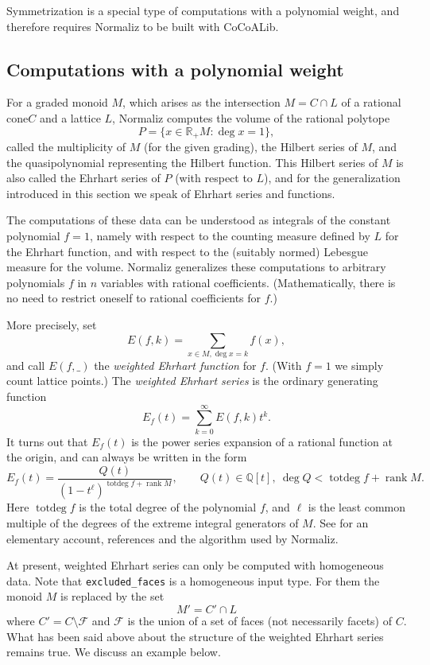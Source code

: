 \documentclass[12pt,a4paper]{scrartcl}
\theoremstyle{definition}
\def\QQ{{\mathbb Q}}
\def\RR{{\mathbb R}}
\DeclareMathOperator{\rank}{rank}
\DeclareMathOperator{\totdeg}{totdeg}
\begin{document}
{Symmetrization is a special type of computations with a polynomial weight, and therefore requires Normaliz to be built with CoCoALib. 

\subsection{Computations with a polynomial weight}\label{Poly_comp}

For a graded monoid $M$, which arises as the intersection $M=C\cap L$ of a rational cone$C$  and a lattice $L$,  Normaliz computes the volume of
the rational polytope
$$
P=\{x\in \RR_+ M: \deg x=1\},
$$
called the multiplicity of $M$ (for the given grading), the  Hilbert series of $M$, and the quasipolynomial representing the Hilbert function. This Hilbert series of $M$ is also called the Ehrhart series of $P$ (with respect to $L$), and for the generalization introduced in this section we speak of Ehrhart series and functions.

The computations of these data can be understood as integrals of the
constant polynomial $f=1$, namely with respect to the counting
measure defined by $L$ for the Ehrhart function, and with
respect to the (suitably normed) Lebesgue measure for the
volume. Normaliz generalizes these computations to
arbitrary polynomials $f$ in $n$ variables with rational
coefficients. (Mathematically, there is no need to restrict
oneself to rational coefficients for $f$.)

More precisely, set
$$
E(f,k)=\sum_{x\in M, \deg x=k} f(x),
$$
and call $E(f,\_)$ the \emph{weighted Ehrhart function} for
$f$. (With $f=1$ we simply count lattice points.) The
\emph{weighted Ehrhart series} is the ordinary generating
function
$$
E_f(t)=\sum_{k=0}^\infty E(f,k)t^k.
$$
It turns out that $E_f(t)$ is the power series expansion of a
rational function at the origin, and can always be written in
the form
$$
E_f(t)=\frac{Q(t)}{(1-t^\ell)^{\totdeg f+\rank M}},\qquad Q(t)\in\QQ[t],\
\deg Q< \totdeg f+\rank M.
$$
Here $\totdeg f$ is the total degree of the polynomial $f$, and
$\ell$ is the least common  multiple of the degrees of the
extreme integral generators of $M$. See \cite{BS} for an
elementary account, references and the algorithm used by Normaliz.

At present, weighted Ehrhart series can only be computed  with homogeneous data. Note that \verb|excluded_faces| is a homogeneous input type. For them the monoid $M$ is replaced by the set
$$
M'=C'\cap L
$$
where $C'=C\setminus \mathcal F$ and $\mathcal F$ is the union of a set of
faces
(not necessarily facets) of $C$. What has been said above about the structure
of the weighted Ehrhart series remains true. We discuss an example below.

}
\end{document}
